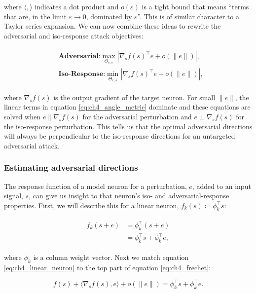 where $\langle , \rangle$ indicates a dot product and $o(\varepsilon)$ is a tight bound that means ``terms that are, in the limit $\varepsilon \rightarrow 0$, dominated by $\varepsilon$''.
This is of similar character to a Taylor series expansion. We can now combine these ideas to rewrite the adversarial and iso-response attack objectives:

\begin{align}\label{eq:ch4_angle_metric}
\begin{split}
    &\textbf{Adversarial:} \max_{\Theta_{e,s}} |\nabla_{s}f(s)^\top e + o(\|e\|)|,\\
    &\textbf{Iso-Response:} \min_{\Theta_{e,s}} |\nabla_{s}f(s)^\top e + o(\|e\|)|,
\end{split}
\end{align}

where $\nabla_{s}f(s)$ is the output gradient of the target neuron.
For small $\|e\|$, the linear terms in equation \eqref{eq:ch4_angle_metric} dominate and these equations are solved when $e \parallel \nabla_{s}f(s)$ for the adversarial perturbation and $e \perp \nabla_{s}f(s)$ for the iso-response perturbation.
This tells us that the optimal adversarial directions will always be perpendicular to the iso-response directions for an untargeted adversarial attack. 

\subsubsection{Estimating adversarial directions}
The response function of a model neuron for a perturbation, $e$, added to an input signal, $s$, can give us insight to that neuron's iso- and adversarial-response properties. First, we will describe this for a linear neuron, $f_{k}(s) \coloneqq \phi_{k}^\top s$:

\begin{align}\label{eq:ch4_linear_neuron}
\begin{split}
    f_{k}(s+e) &= \phi_{k}^\top (s + e) \\
    &= \phi_{k}^\top s +\phi_{k}^\top e,
\end{split}
\end{align}

where $\phi_{k}$ is a column weight vector. Next we match equation \eqref{eq:ch4_linear_neuron} to the top part of equation \eqref{eq:ch4_frechet}:

\begin{equation}
    f(s) + \langle\nabla_{s}f(s), e\rangle + o(\|e\|) = \phi_{k}^\top s + \phi_{k}^\top e.
\end{equation}

